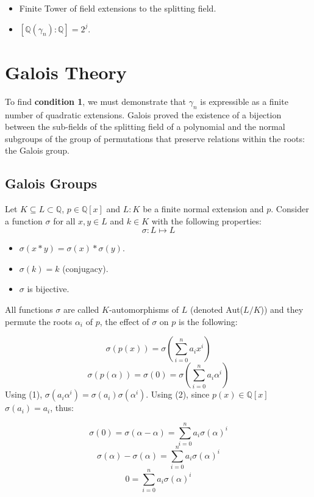 \documentclass{article}
\begin{document}
\begin{itemize}
        \item[\textbf{(Condition 1)}] Finite Tower of field extensions to the splitting field. 
        \item [\textbf{(Condition 2)}] $[\mathbb{Q}(\gamma_n):\mathbb{Q}] = 2^j$.
    \end{itemize}

\section{Galois Theory}
To find \textbf{condition 1}, we must demonstrate that $\gamma_n$ is expressible as a finite number of quadratic extensions. Galois proved the existence of a bijection between the sub-fields of the splitting field of a polynomial and the normal subgroups of the group of permutations that preserve relations within the roots: the Galois group.

\subsection{Galois Groups}
\par
Let $K\subseteq L \subset\mathbb{Q}$, $p\in\mathbb{Q}[x]$ and $L:K$ be a finite normal extension and $p$. Consider a function $\sigma$ for all $x,y \in L$ and $k\in K$ with the following properties:
$$\sigma : L \mapsto L$$
    \begin{itemize}
        \item[(1)] $\sigma(x*y) = \sigma(x) * \sigma(y).$
        \item [(2)] $\sigma(k) = k$ (conjugacy).
        \item[(3)] $\sigma$ is bijective.
    \end{itemize}
\par
All functions $\sigma$ are called $K$-automorphisms of $L$ (denoted Aut($L/K$)) and they permute the roots $\alpha_i$ of $p$, the effect of $\sigma$ on $p$ is the following:

$$\sigma(p(x))=\sigma(\sum_{i=0}^{n}a_{i}x^{i})$$
$$\sigma(p(\alpha))= \sigma(0) = \sigma(\sum_{i=0}^{n}a_{i}\alpha^{i})$$ 
Using (1), $\sigma(a_{i}\alpha^{i}) = \sigma(a_i)\sigma(\alpha^i)$. Using (2), since $p(x)\in\mathbb{Q}[x]$ $\sigma(a_i) = a_i$, thus:

$$ \sigma(0) = \sigma(\alpha - \alpha) = \sum_{i=0}^{n}a_{i}\sigma(\alpha)^{i} $$
$$ \sigma(\alpha) - \sigma(\alpha) = \sum_{i=0}^{n}a_{i}\sigma(\alpha)^{i} $$
$$0 = \sum_{i=0}^{n}a_{i}\sigma(\alpha)^{i} $$
\end{document}

